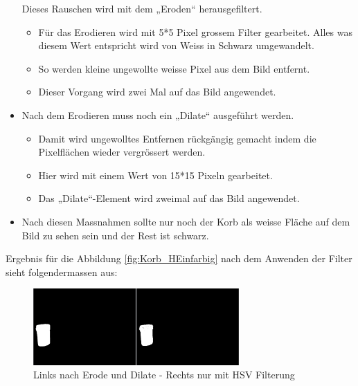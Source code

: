 \begin{itemize}
        Dieses Rauschen wird mit dem „Eroden“ herausgefiltert.
    \begin{itemize}
        \item Für das Erodieren wird mit 5*5 Pixel grossem Filter gearbeitet. 
            Alles was diesem Wert entspricht wird von Weiss in Schwarz 
            umgewandelt.
        \item So werden kleine ungewollte weisse Pixel aus dem Bild entfernt.
        \item Dieser Vorgang wird zwei Mal auf das Bild angewendet.
    \end{itemize}
    \item Nach dem Erodieren muss noch ein „Dilate“ ausgeführt werden.
    \begin{itemize}
        \item Damit wird ungewolltes Entfernen rückgängig gemacht 
            indem die Pixelflächen wieder vergrössert werden.
        \item Hier wird mit einem Wert von 15*15 Pixeln gearbeitet.
        \item Das „Dilate“-Element wird zweimal auf das Bild angewendet.
    \end{itemize}
    \item Nach diesen Massnahmen sollte nur noch der Korb als weisse Fläche 
        auf dem Bild zu sehen sein und der Rest ist schwarz.
\end{itemize}

Ergebnis für die Abbildung \ref{fig:Korb_HEinfarbig} nach dem Anwenden der 
Filter sieht folgendermassen aus:

\begin{figure}[h!]
    \centering
    \includegraphics[width=0.7\textwidth]{fig/Korberkennung1.png}
    \caption{Links nach Erode und Dilate - Rechts nur mit HSV Filterung}
    \label{fig:Korb_Erkennung}
\end{figure}

